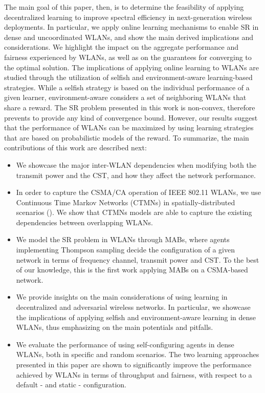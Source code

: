 \documentclass[preprint,12pt]{elsarticle}
\begin{document}
The main goal of this paper, then, is to determine the feasibility of applying decentralized learning to improve spectral efficiency in next-generation wireless deployments. In particular, we apply online learning mechanisms to enable SR in dense and uncoordinated WLANs, and show the main derived implications and considerations. We highlight the impact on the aggregate performance and fairness experienced by WLANs, as well as on the guarantees for converging to the optimal solution. The implications of applying online learning to WLANs are studied through the utilization of selfish and environment-aware learning-based strategies. While a selfish strategy is based on the individual performance of a given learner, environment-aware considers a set of neighboring WLANs that share a reward. The SR problem presented in this work is non-convex, therefore prevents to provide any kind of convergence bound. However, our results suggest that the performance of WLANs can be maximized by using learning strategies that are based on probabilistic models of the reward. To summarize, the main contributions of this work are described next:
\begin{itemize}
	\item We showcase the major inter-WLAN dependencies when modifying both the transmit power and the CST, and how they affect the network performance.
	\item In order to capture the CSMA/CA operation of IEEE 802.11 WLANs, we use Continuous Time Markov Networks (CTMNs) in spatially-distributed scenarios (\citealp{bellalta2017throughput}). We show that CTMNs models are able to capture the existing dependencies between overlapping WLANs. 	
	\item We model the SR problem in WLANs through MABs, where agents implementing Thompson sampling decide the configuration of a given network in terms of frequency channel, transmit power and CST. To the best of our knowledge, this is the first work applying MABs on a CSMA-based network.
	\item We provide insights on the main considerations of using learning in decentralized and adversarial wireless networks. In particular, we showcase the implications of applying selfish and environment-aware learning in dense WLANs, thus emphasizing on the main potentials and pitfalls.
	\item We evaluate the performance of using self-configuring agents in dense WLANs, both in specific and random scenarios. The two learning approaches presented in this paper are shown to significantly improve the performance achieved by WLANs in terms of throughput and fairness, with respect to a default - and static - configuration.
\end{itemize}		
\end{document}
